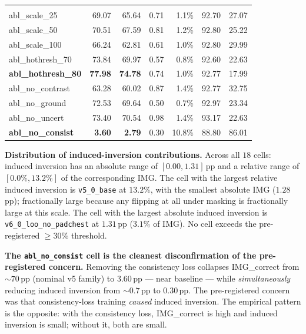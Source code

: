 \documentclass{article}
\begin{document}
\begin{table}[t]
\begin{tabular}{lrrrrrr}
\addlinespace
\multicolumn{7}{l}{\emph{v5 ablations.}}\\
abl\_scale\_25                & 69.07 & 65.64 & 0.71 & \phantom{0}1.1\% & 92.70 & 27.07\\
abl\_scale\_50                & 70.51 & 67.59 & 0.81 & \phantom{0}1.2\% & 92.80 & 25.22\\
abl\_scale\_100               & 66.24 & 62.81 & 0.61 & \phantom{0}1.0\% & 92.80 & 29.99\\
abl\_hothresh\_70             & 73.84 & 69.97 & 0.57 & \phantom{0}0.8\% & 92.60 & 22.63\\
\textbf{abl\_hothresh\_80}    & \textbf{77.98} & \textbf{74.78} & 0.74 & \phantom{0}1.0\% & 92.77 & 17.99\\
abl\_no\_contrast             & 63.28 & 60.02 & 0.87 & \phantom{0}1.4\% & 92.77 & 32.75\\
abl\_no\_ground               & 72.53 & 69.64 & 0.50 & \phantom{0}0.7\% & 92.97 & 23.34\\
abl\_no\_uncert               & 73.40 & 70.54 & 0.98 & \phantom{0}1.4\% & 93.17 & 22.63\\
\textbf{abl\_no\_consist}     & \textbf{\phantom{0}3.60}  & \textbf{\phantom{0}2.79}  & 0.30 & \phantom{0}10.8\% & 88.80 & 86.01\\
\bottomrule
\end{tabular}
\end{table}

\textbf{Distribution of induced-inversion contributions.} Across all
$18$ cells: induced inversion has an absolute range of
$[0.00, 1.31]$\,pp and a relative range of $[0.0\%, 13.2\%]$ of the
corresponding IMG. The cell with the largest relative induced inversion
is \texttt{v5\_0\_base} at $13.2\%$, with the smallest absolute IMG
($1.28$\,pp); fractionally large because any flipping at all under
masking is fractionally large at this scale. The cell with the largest
absolute induced inversion is \texttt{v6\_0\_loo\_no\_padchest} at
$1.31$\,pp ($3.1\%$ of IMG). No cell exceeds the pre-registered
$\geq 30\%$ threshold.

\textbf{The \texttt{abl\_no\_consist} cell is the cleanest
disconfirmation of the pre-registered concern.} Removing the consistency
loss collapses IMG\_correct from $\sim 70$\,pp (nominal v5 family) to
$3.60$\,pp --- near baseline --- while \emph{simultaneously} reducing
induced inversion from $\sim 0.7$\,pp to $0.30$\,pp. The pre-registered
concern was that consistency-loss training \emph{caused} induced
inversion. The empirical pattern is the opposite: with the consistency
loss, IMG\_correct is high and induced inversion is small; without it,
both are small.
\end{document}
